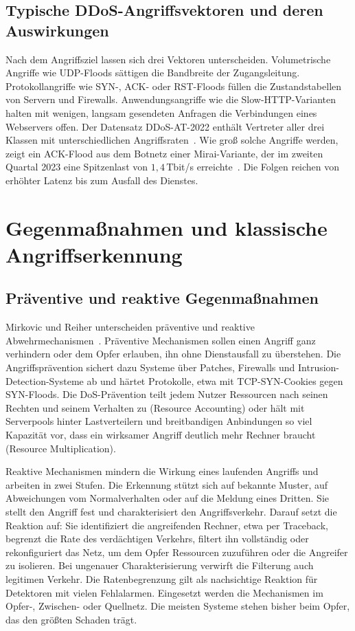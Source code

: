 \subsection{Typische DDoS-Angriffsvektoren und deren Auswirkungen}
Nach dem Angriffsziel lassen sich drei Vektoren unterscheiden. Volumetrische Angriffe wie UDP-Floods sättigen die Bandbreite der Zugangsleitung. Protokollangriffe wie SYN-, ACK- oder RST-Floods füllen die Zustandstabellen von Servern und Firewalls. Anwendungsangriffe wie die Slow-HTTP-Varianten halten mit wenigen, langsam gesendeten Anfragen die Verbindungen eines Webservers offen. Der Datensatz \mbox{DDoS-AT-2022} enthält Vertreter aller drei Klassen mit unterschiedlichen Angriffsraten~\autocite{mittalDDoSAT2022DistributedDenial2023}. Wie groß solche Angriffe werden, zeigt ein ACK-Flood aus dem Botnetz einer Mirai-Variante, der im zweiten Quartal 2023 eine Spitzenlast von $1{,}4$\,Tbit/s erreichte~\autocite{balaAITechniquesIoTbased2024}. Die Folgen reichen von erhöhter Latenz bis zum Ausfall des Dienstes.

\section{Gegenmaßnahmen und klassische Angriffserkennung}
\label{sec:klassische_erkennung}
\subsection{Präventive und reaktive Gegenmaßnahmen}
\label{sec:gegenmassnahmen}
Mirkovic und Reiher unterscheiden präventive und reaktive Abwehrmechanismen~\autocite{mirkovicTaxonomyDDoSAttack2004}. Präventive Mechanismen sollen einen Angriff ganz verhindern oder dem Opfer erlauben, ihn ohne Dienstausfall zu überstehen. Die Angriffsprävention sichert dazu Systeme über Patches, Firewalls und Intrusion-Detection-Systeme ab und härtet Protokolle, etwa mit TCP-SYN-Cookies gegen SYN-Floods. Die DoS-Prävention teilt jedem Nutzer Ressourcen nach seinen Rechten und seinem Verhalten zu (Resource Accounting) oder hält mit Serverpools hinter Lastverteilern und breitbandigen Anbindungen so viel Kapazität vor, dass ein wirksamer Angriff deutlich mehr Rechner braucht (Resource Multiplication).

Reaktive Mechanismen mindern die Wirkung eines laufenden Angriffs und arbeiten in zwei Stufen. Die Erkennung stützt sich auf bekannte Muster, auf Abweichungen vom Normalverhalten oder auf die Meldung eines Dritten. Sie stellt den Angriff fest und charakterisiert den Angriffsverkehr. Darauf setzt die Reaktion auf: Sie identifiziert die angreifenden Rechner, etwa per Traceback, begrenzt die Rate des verdächtigen Verkehrs, filtert ihn vollständig oder rekonfiguriert das Netz, um dem Opfer Ressourcen zuzuführen oder die Angreifer zu isolieren. Bei ungenauer Charakterisierung verwirft die Filterung auch legitimen Verkehr. Die Ratenbegrenzung gilt als nachsichtige Reaktion für Detektoren mit vielen Fehlalarmen. Eingesetzt werden die Mechanismen im Opfer-, Zwischen- oder Quellnetz. Die meisten Systeme stehen bisher beim Opfer, das den größten Schaden trägt.

